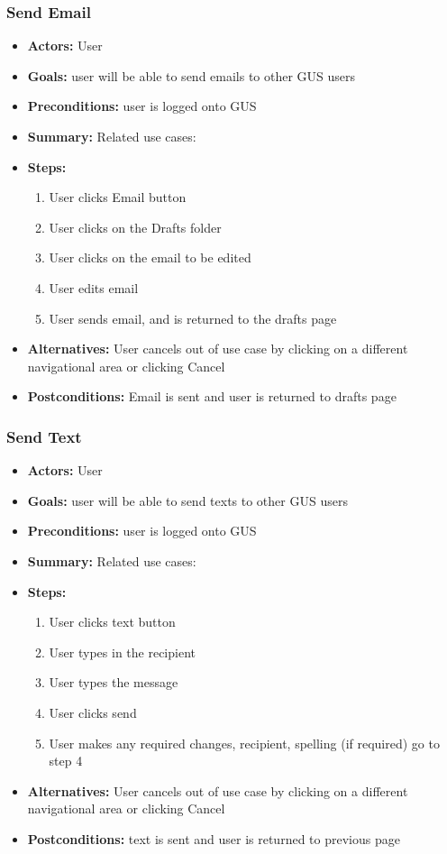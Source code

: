 \documentclass[12pt, oneside, letterpaper]{report}
\begin{document}
         \subsubsection{Send Email}
			\begin{itemize}
				\item{\textbf{Actors:} User}
				\item{\textbf{Goals:} user will be able to send emails to other GUS users}
				\item{\textbf{Preconditions:} user is logged onto GUS}
				\item{\textbf{Summary:} Related use cases: }
				\item{\textbf{Steps:}
				\begin{enumerate}
					\item{User clicks Email button}
					\item{User clicks on the Drafts folder}
					\item{User clicks on the email to be edited}
					\item{User edits email}
					\item{User sends email, and is returned to the drafts page}
				\end{enumerate}
				}
				\item{\textbf{Alternatives:} User cancels out of use case by clicking on a different navigational area or clicking Cancel}
				\item{\textbf{Postconditions:} Email is sent and user is returned to drafts page}
			\end{itemize}
         \subsubsection{Send Text}
			\begin{itemize}
				\item{\textbf{Actors:} User}
				\item{\textbf{Goals:} user will be able to send texts to other GUS users}
				\item{\textbf{Preconditions:} user is logged onto GUS}
				\item{\textbf{Summary:} Related use cases: }
				\item{\textbf{Steps:}
				\begin{enumerate}
					\item{User clicks text button}
					\item{User types in the recipient}
					\item{User types the message}
					\item{User clicks send}
					\item{User makes any required changes, recipient, spelling (if required) go to step 4}
				\end{enumerate}
				}
				\item{\textbf{Alternatives:} User cancels out of use case by clicking on a different navigational area or clicking Cancel}
				\item{\textbf{Postconditions:} text is sent and user is returned to previous page}
			\end{itemize}
\end{document}
